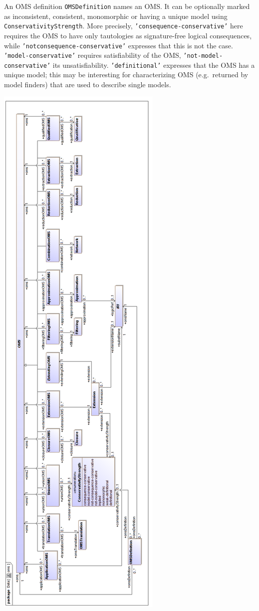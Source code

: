 \documentclass[10pt,fleqn,final]{scrreprt}
\newcommand*{\syntax}[1]{\texttt{#1}}
\newenvironment{definitions}[0]{\medskip }{}
\begin{document}
\begin{definitions}
An OMS definition \syntax{OMSDefinition} names an OMS.  It can be
optionally marked as inconsistent, consistent, monomorphic or having a
unique model using \syntax{ConservativityStrength}. More precisely,
\syntax{'consequence-conservative'} here requires the OMS to have only
tautologies as signature-free logical consequences, while
\syntax{'not\-consequence-conservative'} expresses that this is not
the case.  \syntax{'model-conservative'} requires satisfiability of
the OMS, \syntax{'not-model-conservative'} its unsatisfiability.
\syntax{'de\-fi\-nitional'} expresses  that the OMS has a unique
model; this may be interesting for characterizing OMS
(e.g.\ returned by model finders) that are used to describe single
models.

\newpage
\voffset -2cm
\begin{center}
\includegraphics[scale=0.47]{mof/oms.png}

\end{center}
\end{definitions}
\end{document}
